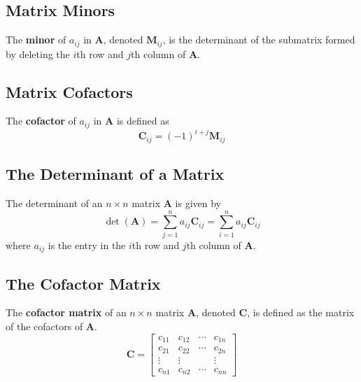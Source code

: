 \documentclass{article}
\begin{document}
\subsection{Matrix Minors}
\begin{definition}
    The \textbf{minor} of \(a_{ij}\) in \(\symbf{A}\), denoted
    \(\symbf{M}_{ij}\), is the determinant of the submatrix formed by deleting
    the \(i\)th row and \(j\)th column of \(\symbf{A}\).
\end{definition}
\subsection{Matrix Cofactors}
\begin{definition}
    The \textbf{cofactor} of \(a_{ij}\) in \(\symbf{A}\) is defined as
    \begin{equation*}
        \symbf{C}_{ij} = \left( -1 \right)^{i+j} \symbf{M}_{ij}
    \end{equation*}
\end{definition}
\subsection{The Determinant of a Matrix}
\begin{theorem}
    The determinant of an \(n\times n\) matrix \(\symbf{A}\) is given
    by
    \begin{equation*}
        \det{\left( \symbf{A} \right)} = \sum_{j=1}^n a_{ij}\symbf{C}_{ij} = \sum_{i=1}^n a_{ij}\symbf{C}_{ij}
    \end{equation*}
    where \(a_{ij}\) is the entry in the \(i\)th row and \(j\)th column
    of \(\symbf{A}\).
\end{theorem}
\subsection{The Cofactor Matrix}
\begin{definition}
    The \textbf{cofactor matrix} of an \(n\times n\) matrix
    \(\symbf{A}\), denoted \(\symbf{C}\), is defined as the matrix
    of the cofactors of \(\symbf{A}\).
    \begin{equation*}
        \symbf{C} =
        \begin{bmatrix}
            c_{11} & c_{12} & \cdots & c_{1n} \\
            c_{21} & c_{22} & \cdots & c_{2n} \\
            \vdots & \vdots &        & \vdots \\
            c_{n1} & c_{n2} & \cdots & c_{nn}
        \end{bmatrix}
    \end{equation*}
\end{definition}
\end{document}
